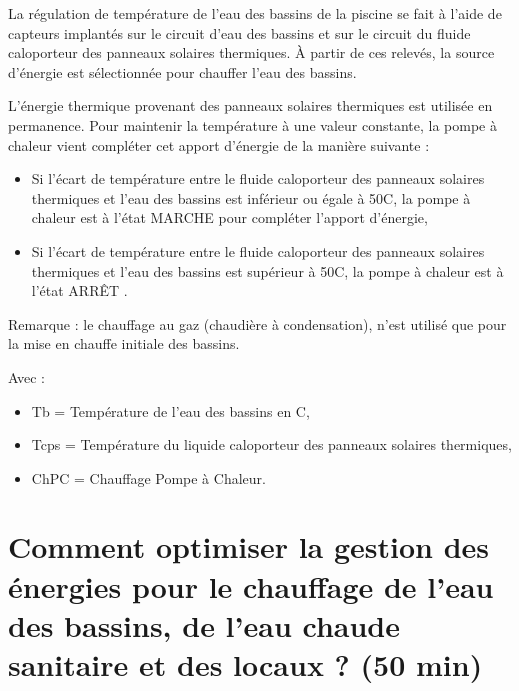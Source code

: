 
La régulation de température de l'eau des bassins de la piscine se fait à l'aide de capteurs implantés sur le circuit d'eau des bassins et sur le circuit du fluide caloporteur des panneaux solaires thermiques. À partir de ces relevés, la source d'énergie est sélectionnée pour chauffer l'eau des bassins.

L'énergie thermique provenant des panneaux solaires thermiques est utilisée en permanence. Pour maintenir la température à une valeur constante, la pompe à chaleur vient compléter cet apport d'énergie de la manière suivante :
\begin{itemize}
 \item Si l'écart de température entre le fluide caloporteur des panneaux solaires thermiques et l'eau des bassins est inférieur ou égale à 50\textdegree C, la pompe à chaleur est à l'état \og MARCHE \fg pour compléter l'apport d'énergie,
 \item Si l'écart de température entre le fluide caloporteur des panneaux solaires thermiques et l'eau des bassins est supérieur à 50\textdegree C, la pompe à chaleur est à l'état \og ARRÊT \fg.
\end{itemize}

Remarque : le chauffage au gaz (chaudière à condensation), n'est utilisé que pour la mise en chauffe initiale des bassins.

Avec :
\begin{itemize}
 \item Tb = Température de l'eau des bassins en \textdegree C,
 \item Tcps = Température du liquide caloporteur des panneaux solaires thermiques,
 \item ChPC = Chauffage Pompe à Chaleur.
\end{itemize}


\newpage

\section{Comment optimiser la gestion des énergies pour le chauffage de l'eau des bassins, de l'eau chaude sanitaire et des locaux ? (50 min)}

